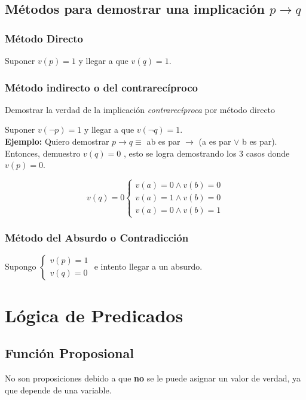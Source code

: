 \documentclass[a4paper, twoside]{article}
\begin{document}
\subsection{Métodos para demostrar una implicación $p \to q$}
\subsubsection{Método Directo}
Suponer $v(p) = 1$ y llegar a que $v(q) = 1$.

\subsubsection{Método indirecto o del contrarecíproco}
Demostrar la verdad de la implicación \emph{contrarecíproca} por método directo

Suponer $v(\lnot p) = 1$ y llegar a que $v(\lnot q) = 1$.\\

\textbf{Ejemplo:} Quiero demostrar $p \to q \equiv$ ab es par $\to$ (a es par $\lor$ b es par).
Entonces, demuestro $v(q) = 0$ , esto se logra demostrando los 3 casos donde $v(p) = 0$.

\begin{equation*}
	v(q)=0\left\{ 	\begin{array}{c}
						v(a)=0\wedge v(b)=0\\
						v(a)=1\wedge v(b)=0\\
						v(a)=0\wedge v(b)=1
					\end{array}\right.
\end{equation*}

\subsubsection{Método del Absurdo o Contradicción}
Supongo $\left\{ \begin{array}{c} v(p)=1\\ v(q)=0\end{array}\right.$ e intento llegar a un absurdo.

\newpage
\section{Lógica de Predicados}
\subsection{Función Proposional}
No son proposiciones debido a que \textbf{no} se le puede asignar un valor de verdad, ya que depende de una variable.\\
\end{document}
